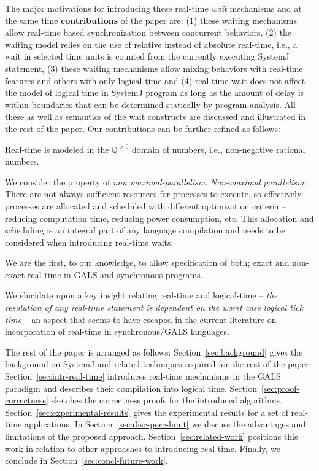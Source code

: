 The major motivations for introducing these real-time \textit{wait}
mechanisms and at the same time \textbf{contributions} of the paper are:
(1) these waiting mechanisms allow real-time based synchronization
between concurrent behaviors, (2) the waiting model relies on the use of
relative instead of absolute real-time, i.e., a wait in selected time
units is counted from the currently executing SystemJ statement, (3)
these waiting mechanisms allow mixing behaviors with real-time features
and others with only logical time and (4) real-time wait does not affect
the model of logical time in SystemJ program as long as the amount of
delay is within boundaries that can be determined statically by program
analysis. All these as well as semantics of the wait constructs are
discussed and illustrated in the rest of the paper. Our contributions
can be further refined as follows:
\begin{enumerate*}
\item Real-time is modeled in the $\mathbb{Q}^{>0}$ domain of numbers,
 i.e., non-negative rational numbers.
\item We consider the property of \textit{non
    maximal-parallelism}. \textit{Non-maximal parallelism:} There are
  not always sufficient resources for processes to execute, so
  effectively processes are allocated and scheduled with different
  optimization criteria -- reducing computation time, reducing power
  consumption, etc. This allocation and scheduling is an integral part
  of any language compilation and needs to be considered when
  introducing real-time waits.
\item We are the first, to our knowledge, to allow specification of
  both; exact and non-exact real-time in GALS and synchronous programs.
\item We elucidate upon a key insight relating real-time and
  logical-time -- \textit{the resolution of any real-time statement is
    dependent on the worst case logical tick time} -- an aspect that
  seems to have escaped in the current literature on incorporation of
  real-time in synchronous/GALS languages.
\end{enumerate*}

The rest of the paper is arranged as follows:
Section~\ref{sec:background} gives the background on SystemJ and related
techniques required for the rest of the
paper. Section~\ref{sec:intr-real-time} introduces real-time mechanisms
in the GALS paradigm and describes their compilation into logical
time. Section~\ref{sec:proof-correctness} sketches the correctness
proofs for the introduced
algorithms. Section~\ref{sec:experimental-results} gives the
experimental results for a set of real-time applications. In
Section~\ref{sec:disc-perc-limit} we discuss the advantages and
limitations of the proposed approach. Section~\ref{sec:related-work}
positions this work in relation to other approaches to introducing
real-time. Finally, we conclude in Section~\ref{sec:concl-future-work}.


